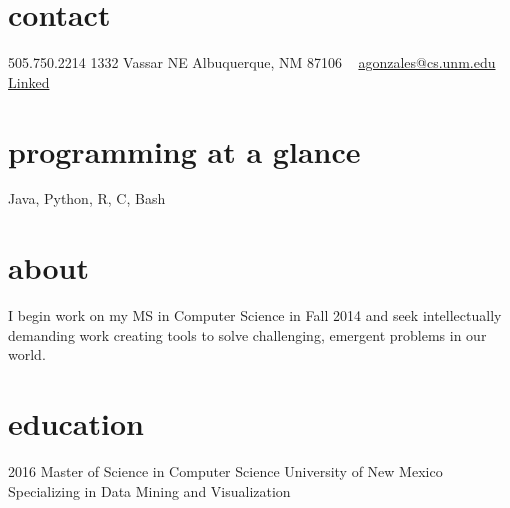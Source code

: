 \documentclass[]{friggeri-cv} %
\begin{document}


\begin{aside} %
\section{contact}
505.750.2214 
1332 Vassar NE
Albuquerque, NM 87106
~
\href{mailto:agonzales@cs.unm.edu}{agonzales@cs.unm.edu}
~
\href{http://lnkd.in/b8kfQSe}{Linked\scriptsize{\faLinkedin}}
\section{programming at a glance}
Java, Python, R, C, Bash
~
\section{about}
I begin work on my MS in Computer Science in Fall 2014 and seek intellectually demanding work creating tools to solve challenging, emergent problems in our world.
\end{aside}




\section{education}
\begin{entrylist}
\entry
{2016}
{Master of Science {\normalfont in Computer Science}}
{University of New Mexico}
{Specializing in Data Mining and Visualization}
\end{entrylist}
\end{document}
